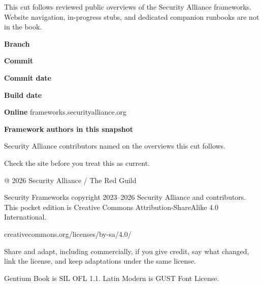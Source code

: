 \clearpage
{}
\begingroup
\setlength{\parskip}{0.85mm}
\fontsize{8}{10}\selectfont
{}

This cut follows reviewed public overviews of
the Security Alliance frameworks. Website
navigation, in-progress stubs, and dedicated
companion runbooks are not in the book.

\vspace{1mm}
\textbf{Branch} \quad \texttt{\SourceRef}

\textbf{Commit} \quad \SourceCommit

\textbf{Commit date} \quad \SourceCommitDate

\textbf{Build date} \quad \BuildDate

\textbf{Online} \quad frameworks.securityalliance.org

\textbf{Framework authors in this snapshot}

Security Alliance contributors named on the
overviews this cut follows.

\vspace{0.4mm}
Check the site before you treat this as current.
\endgroup

\clearpage
{}
\begingroup
\setlength{\parskip}{1.1mm}
\vspace*{2mm}
{\fontsize{9}{11}\selectfont @ 2026 Security Alliance / The Red Guild\par}
\vspace{2.5mm}
\fontsize{8}{10}\selectfont

Security Frameworks copyright 2023--2026 Security
Alliance and contributors. This pocket edition is
Creative Commons Attribution-ShareAlike 4.0
International.

creativecommons.org/licenses/by-sa/4.0/

Share and adapt, including commercially, if you give
credit, say what changed, link the license, and keep
adaptations under the same license.

Gentium Book is SIL OFL 1.1. Latin Modern is GUST Font
License.

\clearpage
\endgroup
